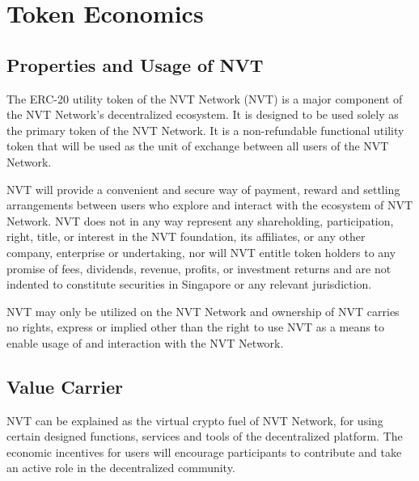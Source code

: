 
\chapter{Token Economics} %

\label{Chapter4} %


\section{Properties and Usage of NVT}

The ERC-20 utility token of the NVT Network (NVT) is a major component of the NVT Network’s decentralized ecosystem. It is designed to be used solely as the primary token of the NVT Network. It is a non-refundable functional utility token that will be used as the unit of exchange between all users of the NVT Network.

NVT will provide a convenient and secure way of payment, reward and settling arrangements between users who explore and interact with the ecosystem of NVT Network. NVT does not in any way represent any shareholding, participation, right, title, or interest in the NVT foundation, its affiliates, or any other company, enterprise or undertaking, nor will NVT entitle token holders to any promise of fees, dividends, revenue, profits, or investment returns and are not indented to constitute securities in Singapore or any relevant jurisdiction.

NVT may only be utilized on the NVT Network and ownership of NVT carries no rights, express or implied other than the right to use NVT as a means to enable usage of and interaction with the NVT Network.

\section{Value Carrier}

NVT can be explained as the virtual crypto fuel of NVT Network, for using certain designed functions, services and tools of the decentralized platform. The economic incentives for users will encourage participants to contribute and take an active role in the decentralized community.

